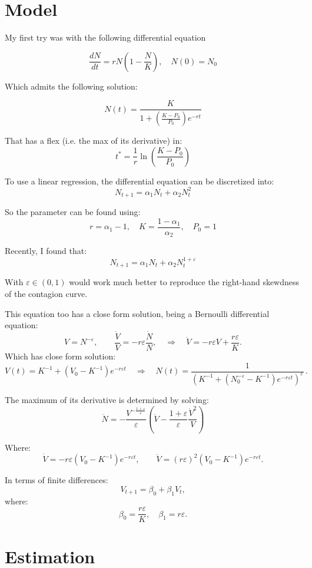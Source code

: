 \documentclass[12pt]{article}
\begin{document}
    \section{Model}
    My first try was with the following differential equation

    $$\frac{dN}{dt} = r N \left(1-\frac{N}{K}\right), \quad N(0)=N_0$$

    Which admits the following solution:

    $$N(t) = \frac{K}{1+ \left(\frac{K-P_0}{P_0}\right) e^{-rt}}$$

    That has a flex (i.e. the max of its derivative) in:
    $$ t^* = \frac{1}{r}\ln \left(\frac{K-P_0}{P_0}\right)$$

    To use a linear regression, the differential equation can be discretized into:
    $$ N_{t+1} = \alpha_1 N_t + \alpha_2 N_{t}^2$$

    So the parameter can be found using:
    $$ r = \alpha_1-1, \quad K= \frac{1-\alpha_1}{\alpha_2}, \quad P_0 = 1$$

    Recently, I found that:
    \begin{equation}
        N_{t+1} = \alpha_1 N_t + \alpha_2 N_{t}^{1 + \varepsilon}\label{eq:equation0}
    \end{equation}

    With $\varepsilon \in (0,1)$ would work much better to reproduce the right-hand skewdness of the contagion curve.

    This equation too has a close form solution, being a Bernoulli differential equation:
    $$V = N^{-\varepsilon}, \qquad \frac{\dot V}{V} = -r \varepsilon \frac{\dot N}{N}, \quad \Rightarrow \quad \dot V = -r\varepsilon V + \frac{r\varepsilon}{K}. $$
    Which has close form solution:
    $$ V(t) = K^{-1} + \left(V_0-K^{-1}\right)e^{-r\varepsilon t} \quad \Rightarrow \quad N(t)=\frac{1}{\left(K^{-1} + \left(N_0^{-\varepsilon}-K^{-1}\right)e^{-r\varepsilon t}\right)^\varepsilon}\,.$$

    The maximum of its derivative is determined by solving:
    $$ \ddot N = -\frac{V^{-\frac{1+\varepsilon}{\varepsilon}}}{\varepsilon} \left(\ddot V -\frac{1+\varepsilon}{\varepsilon} \frac{\dot V ^2}{V}\right)$$

    Where:
    $$ \dot V = -r\varepsilon\left(V_0-K^{-1}\right)e^{-r\varepsilon t}, \qquad \ddot V = (r\varepsilon)^2 \left(V_0-K^{-1}\right)e^{-r\varepsilon t}. $$

    In terms of finite differences:
    $$ V_{t+1} = \beta_0 + \beta_1 V_t,$$
    where:
    $$\beta_0 = \frac{r \varepsilon}{K}, \quad \beta_1=  r\varepsilon.$$

    \section{Estimation}\label{sec:estimation}
    
\end{document}
